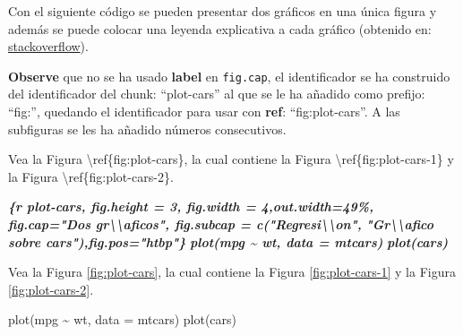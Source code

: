 \documentclass[12pt,a4paper,oneside,]{book}
\newenvironment{Shaded}{\begin{snugshade}}{\end{snugshade}}
\newcommand{\AttributeTok}[1]{\textcolor[rgb]{0.77,0.63,0.00}{#1}}
\newcommand{\FunctionTok}[1]{\textcolor[rgb]{0.00,0.00,0.00}{#1}}
\newcommand{\InformationTok}[1]{\textcolor[rgb]{0.56,0.35,0.01}{\textbf{\textit{#1}}}}
\newcommand{\NormalTok}[1]{#1}
\newcommand{\SpecialCharTok}[1]{\textcolor[rgb]{0.00,0.00,0.00}{#1}}
\numberwithin{dummy}{section}
\theoremstyle{ocrenumbox}
\theoremstyle{blacknumex}
\theoremstyle{blacknumbox}
\theoremstyle{ocrenum}
\theoremstyle{ocrenum}
\begin{document}
Con el siguiente código se pueden presentar dos gráficos en una única
figura y además se puede colocar una leyenda explicativa a cada gráfico
(obtenido en:
\href{https://stackoverflow.com/questions/53850299/how-to-get-a-newline-in-a-figure-caption-in-rmarkdown-bookdown-pdfdocument2}{stackoverflow}).

\textbf{Observe} que no se ha usado \textbf{label} en \texttt{fig.cap},
el identificador se ha construido del identificador del chunk:
``plot-cars'' al que se le ha añadido como prefijo: ``fig:'', quedando
el identificador para usar con \textbf{ref}: ``fig:plot-cars''. A las
subfiguras se les ha añadido números consecutivos.

\begin{Shaded}
\begin{Highlighting}[]

\NormalTok{Vea la Figura \textbackslash{}ref\{fig:plot{-}cars\}, la cual contiene la Figura }
\NormalTok{\textbackslash{}ref\{fig:plot{-}cars{-}1\} y la Figura \textbackslash{}ref\{fig:plot{-}cars{-}2\}.}

\InformationTok{\textasciigrave{}\textasciigrave{}\textasciigrave{}\{r plot{-}cars, fig.height = 3, fig.width = 4,out.width=\textquotesingle{}49\%\textquotesingle{}, }
\InformationTok{fig.cap="Dos gr\textbackslash{}\textbackslash{}\textquotesingle{}aficos", fig.subcap = c("Regresi\textbackslash{}\textbackslash{}\textquotesingle{}on", }
\InformationTok{"Gr\textbackslash{}\textbackslash{}\textquotesingle{}afico sobre cars"),fig.pos="htbp"\}}
\InformationTok{plot(mpg \textasciitilde{} wt, data = mtcars)}
\InformationTok{plot(cars)}
\InformationTok{\textasciigrave{}\textasciigrave{}\textasciigrave{}}
\end{Highlighting}
\end{Shaded}

Vea la Figura \ref{fig:plot-cars}, la cual contiene la Figura
\ref{fig:plot-cars-1} y la Figura \ref{fig:plot-cars-2}.

\begin{Shaded}
\begin{Highlighting}[]
\FunctionTok{plot}\NormalTok{(mpg }\SpecialCharTok{\textasciitilde{}}\NormalTok{ wt, }\AttributeTok{data =}\NormalTok{ mtcars)}
\FunctionTok{plot}\NormalTok{(cars)}
\end{Highlighting}
\end{Shaded}
\end{document}

